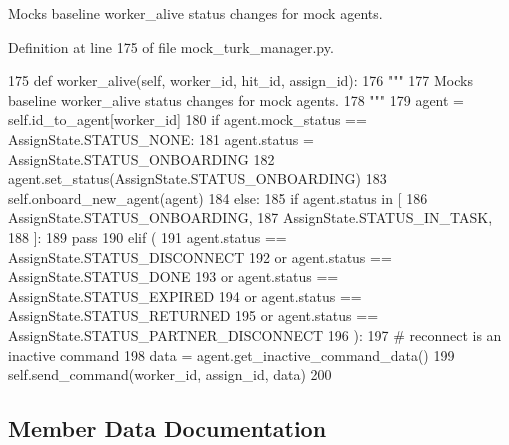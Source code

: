 \begin{DoxyVerb}Mocks baseline worker_alive status changes for mock agents.
\end{DoxyVerb}
 

Definition at line 175 of file mock\+\_\+turk\+\_\+manager.\+py.


\begin{DoxyCode}
175     \textcolor{keyword}{def }worker\_alive(self, worker\_id, hit\_id, assign\_id):
176         \textcolor{stringliteral}{"""}
177 \textcolor{stringliteral}{        Mocks baseline worker\_alive status changes for mock agents.}
178 \textcolor{stringliteral}{        """}
179         agent = self.id\_to\_agent[worker\_id]
180         \textcolor{keywordflow}{if} agent.mock\_status == AssignState.STATUS\_NONE:
181             agent.status = AssignState.STATUS\_ONBOARDING
182             agent.set\_status(AssignState.STATUS\_ONBOARDING)
183             self.onboard\_new\_agent(agent)
184         \textcolor{keywordflow}{else}:
185             \textcolor{keywordflow}{if} agent.status \textcolor{keywordflow}{in} [
186                 AssignState.STATUS\_ONBOARDING,
187                 AssignState.STATUS\_IN\_TASK,
188             ]:
189                 \textcolor{keywordflow}{pass}
190             \textcolor{keywordflow}{elif} (
191                 agent.status == AssignState.STATUS\_DISCONNECT
192                 \textcolor{keywordflow}{or} agent.status == AssignState.STATUS\_DONE
193                 \textcolor{keywordflow}{or} agent.status == AssignState.STATUS\_EXPIRED
194                 \textcolor{keywordflow}{or} agent.status == AssignState.STATUS\_RETURNED
195                 \textcolor{keywordflow}{or} agent.status == AssignState.STATUS\_PARTNER\_DISCONNECT
196             ):
197                 \textcolor{comment}{# reconnect is an inactive command}
198                 data = agent.get\_inactive\_command\_data()
199                 self.send\_command(worker\_id, assign\_id, data)
200 
\end{DoxyCode}


\subsection{Member Data Documentation}
\mbox{\label{classparlai_1_1mturk_1_1webapp_1_1run__mocks_1_1mock__turk__manager_1_1MockTurkManager_a31afd85428c9d5a26fa1863247d57a87}} 
